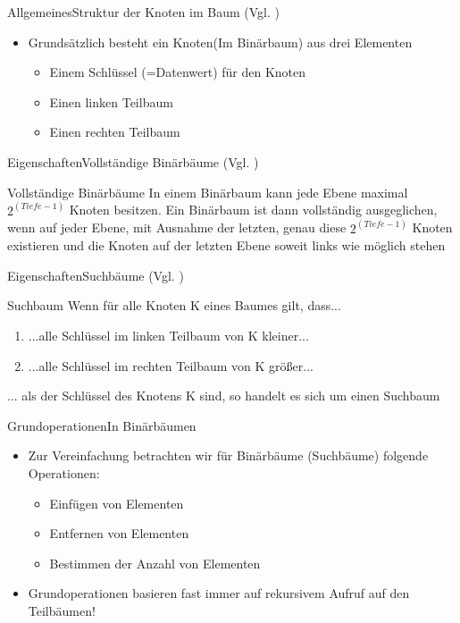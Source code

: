 \begin{frame}{Allgemeines}{Struktur der Knoten im Baum (Vgl. \cite{fahr:list})}
	\begin{itemize}
		\item Grundsätzlich besteht ein Knoten(Im Binärbaum) aus drei Elementen
		\begin{itemize}
			\item Einem Schlüssel (=Datenwert) für den Knoten
			\item Einen linken Teilbaum
			\item Einen rechten Teilbaum
		\end{itemize}
	\end{itemize}
\end{frame}

\begin{frame}{Eigenschaften}{Vollständige Binärbäume (Vgl. \cite{fahr:list})}
	\vfill
	\begin{alertblock}{Vollständige Binärbäume}
	In einem Binärbaum kann jede Ebene maximal $2^{(Tiefe-1)}$ Knoten besitzen. Ein Binärbaum ist dann vollständig ausgeglichen, wenn auf jeder Ebene, mit Ausnahme der letzten, genau diese
	$2^{(Tiefe-1)}$ Knoten existieren und die Knoten auf der letzten Ebene soweit links wie möglich stehen
	\end{alertblock}
	\vfill
\end{frame}

\begin{frame}{Eigenschaften}{Suchbäume (Vgl. \cite{fahr:list})}
	\vfill
	\begin{alertblock}{Suchbaum}
	Wenn für alle Knoten K eines Baumes gilt, dass...
	\begin{enumerate}
		\item ...alle Schlüssel im linken Teilbaum von K kleiner...
		\item ...alle Schlüssel im rechten Teilbaum von K größer...
	\end{enumerate}
	... als der Schlüssel des Knotens K sind, so handelt es sich um einen Suchbaum
	\end{alertblock}
	\vfill
\end{frame}

\begin{frame}{Grundoperationen}{In Binärbäumen}
	\begin{itemize}
		\item Zur Vereinfachung betrachten wir für Binärbäume (Suchbäume) folgende Operationen:
		\begin{itemize}
			\item Einfügen von Elementen
			\item Entfernen von Elementen
			\item Bestimmen der Anzahl von Elementen
		\end{itemize}
		\item Grundoperationen basieren fast immer auf rekursivem Aufruf auf den Teilbäumen!
	\end{itemize}
\end{frame}

